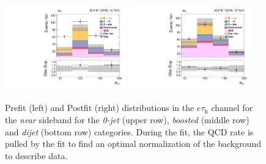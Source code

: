 \begin{figure}[h]
  {\includegraphics[width=0.47\textwidth]{Figures/background_estimation/RQCDOSSS/Postfit/et_dijet2D_antiiso_near/prefit_et_dijet2D_antiiso_near.pdf}}
  {\includegraphics[width=0.47\textwidth]{Figures/background_estimation/RQCDOSSS/Postfit/et_dijet2D_antiiso_near/postfit_et_dijet2D_antiiso_near.pdf}}   
 \caption[Prefit and Postfit distributions in the $e\tau_\text{h}$ channel for the \textit{near} sideband.]{Prefit (left) and Postfit (right) distributions in the $e\tau_\text{h}$ channel for the \textit{near} sideband for the \textit{0-jet} (upper row), \textit{boosted} (middle row) and \textit{dijet} (bottom row) categories.
 During the fit, the QCD rate is pulled by the fit to find an optimal normalization of the background to describe data.}
 \label{fig:etmtqcd:et_prefitpostfit_near}
\end{figure}
\clearpage 
